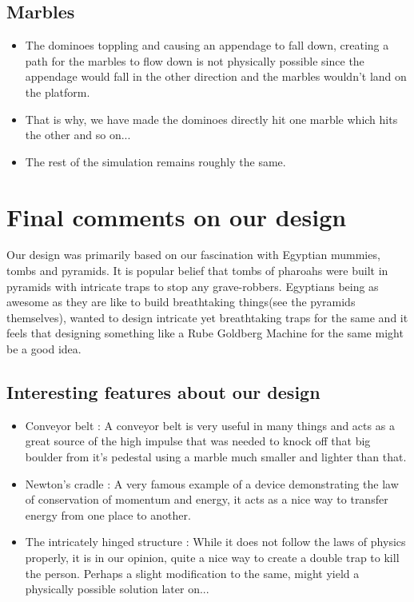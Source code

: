 \documentclass[11pt]{article}
\begin{document}
\subsection{Marbles}
	\begin{itemize}
	\item The dominoes toppling and causing an appendage to fall down, creating a path for the marbles to flow down is not physically possible since the appendage would fall in the other direction and the marbles wouldn't land on the platform. 
	\item That is why, we have made the dominoes directly hit one marble which hits the other and so on... 
	\item The rest of the simulation remains roughly the same.
	\end{itemize}
\section{Final comments on our design}
Our design was primarily based on our fascination with Egyptian mummies, tombs and pyramids. It is popular belief that tombs of pharoahs were built in pyramids with intricate traps to stop any grave-robbers. Egyptians being as awesome as they are like to build breathtaking things(see the pyramids themselves), wanted to design intricate yet breathtaking traps for the same and it feels that designing something like a Rube Goldberg Machine for the same might be a good idea.
\subsection{Interesting features about our design}
\begin{itemize}
	\item Conveyor belt : A conveyor belt is very useful in many things and acts as a great source of the high impulse that was needed to knock off that big boulder from it's pedestal using a marble much smaller and lighter than that.
	\item Newton's cradle : A very famous example of a device demonstrating the law of conservation of momentum and energy, it acts as a nice way to transfer energy from one place to another.
	\item The intricately hinged structure : While it does not follow the laws of physics properly, it is in our opinion, quite a nice way to create a double trap to kill the person. Perhaps a slight modification to the same, might yield a physically possible solution later on...
\end{itemize}
\end{document}
